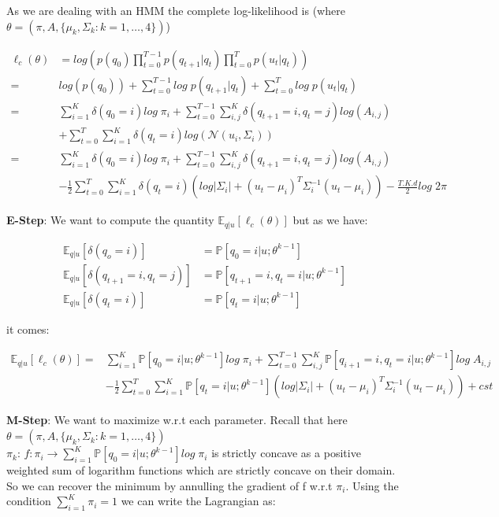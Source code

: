 \documentclass[11pt]{article}
\numberwithin{figure}{section} %
\begin{document}
As we are dealing with an HMM the complete log-likelihood is (where $\theta = (\pi, A, \{\mu_k, \Sigma_k : k=1,\hdots,4\})$)

\begin{align*}
\ell_c(\theta) &= log \left( p(q_0) \prod\limits_{t=0}^{T-1} p(q_{t+1}|q_t) \prod\limits_{t=0}^T p(u_t | q_t) \right) \\
=& log(p(q_0)) + \sum\limits_{t=0}^{T-1} log \; p(q_{t+1} | q_t) + \sum\limits_{t=0}^T log \; p(u_t | q_t) \\
=& \sum\limits_{i=1}^K \delta(q_0 = i) log \; \pi_i + \sum\limits_{t=0}^{T-1} \sum\limits_{i,j}^K \delta(q_{t+1} = i, q_t = j) log(A_{i,j}) \; \\
&+ \sum\limits_{t=0}^T \sum\limits_{i=1}^K \delta(q_t = i) log\left(\mathcal{N}(u_i, \Sigma_i)\right) \\
=& \sum\limits_{i = 1}^K \delta(q_0 =i) log \; \pi_i + \sum\limits_{t=0}^{T-1} \sum\limits_{i,j}^K \delta(q_{t+1} = i, q_t = j) log(A_{i,j}) \; \\
& -\frac{1}{2} \sum\limits_{t=0}^T \sum\limits_{i=1}^K \delta(q_t = i)\left( log |\Sigma_i| + (u_t - \mu_i)^T \Sigma^{-1}_i (u_t - \mu_i)\right)
- \frac{T.K.d}{2} log \; 2\pi
\end{align*}

\textbf{E-Step}: We want to compute the quantity $\mathbb{E}_{q|u}[\ell_c(\theta)]$ but as we have:

\begin{align}
\mathbb{E}_{q|u}[\delta(q_o = i)] &= \mathbb{P}[q_0 = i | u; \theta^{k-1}] \\
\mathbb{E}_{q|u}[\delta(q_{t+1} = i, q_t = j)] &= \mathbb{P}[q_{t+1} = i, q_t = i | u; \theta^{k-1}] \\
\mathbb{E}_{q|u}[\delta(q_t = i)] &= \mathbb{P}[q_t = i | u; \theta^{k-1}]
\end{align}

it comes:

\begin{align*}
\mathbb{E}_{q|u}[\ell_c(\theta)] =& \sum\limits_{i=1}^K \mathbb{P}[q_0 = i | u; \theta^{k-1}] log \; \pi_i + \sum\limits_{t=0}^{T-1} \sum\limits_{i,j}^K \mathbb{P}[q_{i+1} = i, q_t = i | u; \theta^{k-1}] log \; A_{i,j} \\
&-\frac{1}{2} \sum\limits_{t=0}^T \sum\limits_{i=1}^K \mathbb{P}[q_t = i | u; \theta^{k-1}] \left(log|\Sigma_i| + (u_t -\mu_i)^T \Sigma^{-1}_i (u_t - \mu_i)\right) + cst
\end{align*}

\textbf{M-Step}: We want to maximize w.r.t each parameter. Recall that here $\theta = (\pi, A, \{\mu_k, \Sigma_k : k=1,\hdots,4\})$ \\
$\pi_k$: $f: \pi_i \rightarrow \sum\limits_{i=1}^K \mathbb{P}[q_0 = i | u; \theta^{k-1}] log \; \pi_i$ is strictly concave as a positive weighted sum of logarithm functions which are
strictly concave on their domain. So we can recover the minimum by annulling the gradient of f w.r.t $\pi_i$. Using the condition $\sum\limits_{i=1}^K \pi_i = 1$ we can write the Lagrangian as:
\end{document}

